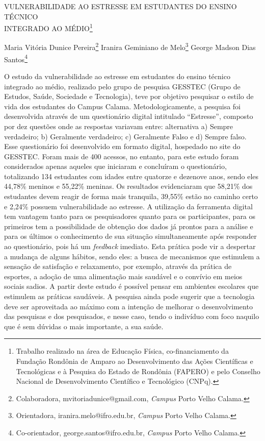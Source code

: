 \documentclass[article,12pt,onesidea,4paper,english,brazil]{abntex2}
\begin{document}
	
	
	\frenchspacing 
	
	\begin{center}
		\LARGE VULNERABILIDADE AO ESTRESSE EM ESTUDANTES DO ENSINO TÉCNICO \\INTEGRADO AO MÉDIO\footnote{Trabalho realizado na área de Educação Física, co-financiamento da Fundação Rondônia de Amparo ao
		Desenvolvimento das Ações Científicas e Tecnológicas e à Pesquisa do Estado de Rondônia (FAPERO) e pelo Conselho Nacional de Desenvolvimento Científico e Tecnológico (CNPq).}
		
		\normalsize
		Maria Vitória Dunice Pereira\footnote{Colaboradora, mvitoriadunice@gmail.com, \textit{Campus} Porto Velho Calama.} 
		Iranira Geminiano de Melo\footnote{Orientadora, iranira.melo@ifro.edu.br, \textit{Campus} Porto Velho Calama.} 
		George Madson Dias Santos\footnote{Co-orientador, george.santos@ifro.edu.br, \textit{Campus} Porto Velho Calama.} 
	\end{center}
	
	\noindent O estudo da vulnerabilidade ao estresse em estudantes do ensino técnico
	integrado ao médio, realizado pelo grupo de pesquisa GESSTEC (Grupo de
	Estudos, Saúde, Sociedade e Tecnologia), teve por objetivo pesquisar o estilo de
	vida dos estudantes do Campus Calama. Metodologicamente, a pesquisa foi
	desenvolvida através de um questionário digital intitulado “Estresse”, composto por
	dez questões onde as respostas variavam entre: alternativa a) Sempre verdadeiro;
	b) Geralmente verdadeiro; c) Geralmente Falso e d) Sempre falso. Esse questionário
	foi desenvolvido em formato digital, hospedado no site do GESSTEC. Foram mais
	de 400 acessos, no entanto, para este estudo foram considerados apenas aqueles
	que iniciaram e concluíram o questionário, totalizando 134 estudantes com idades
	entre quatorze e dezenove anos, sendo eles 44,78\% meninos e 55,22\% meninas.
	Os resultados evidenciaram que 58,21\% dos estudantes devem reagir de forma
	mais tranquila, 39,55\% estão no caminho certo e 2,24\% possuem vulnerabilidade ao
	estresse. A utilização da ferramenta digital tem vantagem tanto para os
	pesquisadores quanto para os participantes, para os primeiros tem a possibilidade
	de obtenção dos dados já prontos para a análise e para os últimos o conhecimento
	de sua situação simultaneamente após responder ao questionário, pois há um
	\textit{feedback} imediato. Esta prática pode vir a despertar a mudança de alguns hábitos,
	sendo eles: a busca de mecanismos que estimulem a sensação de satisfação e
	relaxamento, por exemplo, através da prática de esportes, a adoção de uma
	alimentação mais saudável e o convívio em meios sociais sadios. A partir deste
	estudo é possível pensar em ambientes escolares que estimulem as práticas
	saudáveis. A pesquisa ainda pode sugerir que a tecnologia deve ser aproveitada ao
	máximo com a intenção de melhorar o desenvolvimento das pesquisas e dos
	pesquisados, e nesse caso, tendo o indivíduo com foco naquilo que é sem dúvidas o
	mais importante, a sua saúde.	
	
\end{document}
